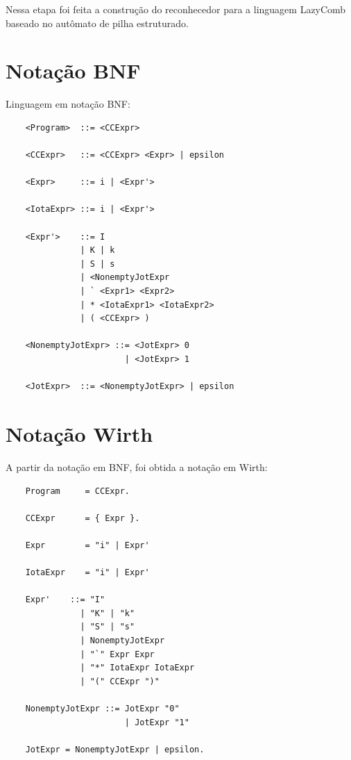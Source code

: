 \label{Cap:construcao-reconhecedor}

Nessa etapa foi feita a construção do reconhecedor para a linguagem LazyComb baseado no autômato de pilha estruturado.

\section{Notação BNF}
\label{sec:notacao-bnf}

Linguagem em notação BNF:

\begin{lstlisting}
    <Program>  ::= <CCExpr>     
                    
    <CCExpr>   ::= <CCExpr> <Expr> | epsilon                   

    <Expr>     ::= i | <Expr'>                      

    <IotaExpr> ::= i | <Expr'>

    <Expr'>    ::= I                        
               | K | k                  
               | S | s                               
               | <NonemptyJotExpr           
               | ` <Expr1> <Expr2>            
               | * <IotaExpr1> <IotaExpr2>    
               | ( <CCExpr> )             

    <NonemptyJotExpr> ::= <JotExpr> 0                
                        | <JotExpr> 1                

    <JotExpr>  ::= <NonemptyJotExpr> | epsilon

\end{lstlisting}

\section{Notação Wirth}

A partir da notação em BNF, foi obtida a notação em Wirth:

\begin{lstlisting}
    Program     = CCExpr.     
                    
    CCExpr      = { Expr }.                  

    Expr        = "i" | Expr'                      

    IotaExpr    = "i" | Expr'

    Expr'    ::= "I"                        
               | "K" | "k"                  
               | "S" | "s"                               
               | NonemptyJotExpr           
               | "`" Expr Expr       
               | "*" IotaExpr IotaExpr    
               | "(" CCExpr ")"             

    NonemptyJotExpr ::= JotExpr "0"                
                        | JotExpr "1"     

    JotExpr = NonemptyJotExpr | epsilon.           
\end{lstlisting}

